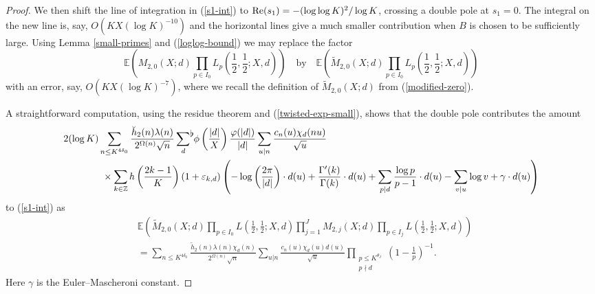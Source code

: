 \documentclass[a4paper,10pt,twoside]{amsart}
\theoremstyle{definition}
\numberwithin{equation}{section}
\newcommand\Z{\mathbb{Z}}
\newcommand\eps{\varepsilon}
\renewcommand{\Re}{\textnormal{Re}}
\renewcommand\:{\colon}
\newcommand{\sumflat}{\mathop{{\sum}^{\raisebox{-3pt}{\makebox[0pt][l]{$\flat$}}}}}
\begin{document}
\begin{proof}
We then shift the line of integration in (\ref{s1-int}) to $\Re(s_1)=-(\log\log K)^2/\log K$, crossing a double pole at $s_1=0$. The integral on the new line is, say, $O(KX(\log K)^{-10})$ and the horizontal lines give a much smaller contribution when $B$ is chosen to be sufficiently large. Using Lemma \ref{small-primes} and (\ref{loglog-bound}) we may replace the factor 
\[ 
\mathbb E\left(M_{2,0}(X;d)\prod_{p\in I_0}L_p\left(\frac12,\frac12;X,d\right)\right) \quad\text{by}\quad \mathbb E\left(\widetilde M_{2,0}(X;d)\prod_{p\in I_0}L_p\left(\frac12,\frac12;X,d\right)\right)
\]
with an error, say, $O(KX(\log K)^{-7})$, where we recall the definition of $\widetilde M_{2,0}(X;d)$ from (\ref{modified-zero}).

A straightforward computation, using the residue theorem and (\ref{twisted-exp-small}), shows that the double pole contributes the amount
\begin{align*}
&2(\log K)\sum_{n\leq K^{4\delta_0}}\frac{\breve h_2(n)\lambda(n)}{2^{\Omega(n)}\sqrt n}\sumflat_{d}\,\phi\left(\frac{|d|}X\right)\frac{\varphi(|d|)}{|d|}\sum_{u|n}\frac{c_n(u)\chi_d(nu)}{\sqrt u}\\
&\qquad\qquad\times\sum_{k\in\Z}h\left(\frac{2k-1}K\right)(1+\eps_{k,d})\left(-\log\left(\frac{2\pi}{|d|}\right)\cdot d(u)+\frac{\Gamma'(k)}{\Gamma(k)}\cdot d(u)+\sum_{p|d}\frac{\log p}{p-1}\cdot d(u)-\sum_{v|u}\log v+\gamma\cdot d(u)\right)
\end{align*} 
to (\ref{s1-int}) as
\begin{align*}
&\mathbb E\left(\widetilde M_{2,0}(X;d)\prod_{p\in I_0}L\left(\frac12,\frac12;X,d\right)\prod_{j=1}^J M_{2,j}(X;d)\prod_{p\in I_j}L\left(\frac12,\frac12;X,d\right)\right)\\
&=\sum_{n\leq K^{4\delta_0}}\frac{\widetilde h_2(n)\lambda(n)\chi_d(n)}{2^{\Omega(n)}\sqrt n}\sum_{u|n}\frac{c_n(u)\chi_d(u)d(u)}{\sqrt u}\prod_{\substack{p\leq K^{\theta_J}\\
p\nmid d}}\left(1-\frac1p\right)^{-1}.
\end{align*}
Here $\gamma$ is the Euler--Mascheroni constant. 


\end{proof}
\end{document}
